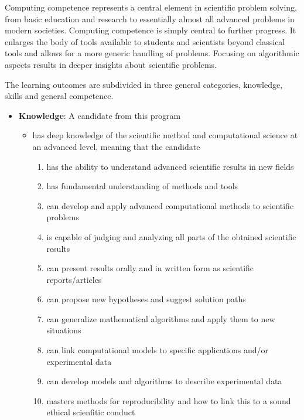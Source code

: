 \documentclass[%
oneside,                 %
final,                   %
10pt]{article}
\begin{document}
Computing competence represents a central element
in scientific problem solving, from basic education and research to
essentially almost all advanced problems in modern
societies. Computing competence is simply central to further
progress. It enlarges the body of tools available to students and
scientists beyond classical tools and allows for a more generic
handling of problems. Focusing on algorithmic aspects results in
deeper insights about scientific problems.

The learning outcomes are subdivided in three general categories, knowledge, skills and general competence.

\begin{itemize}
\item \textbf{Knowledge}: A candidate from this program
\begin{itemize}

 \item has deep knowledge of the scientific method and computational science at an advanced level, meaning that the candidate
\begin{enumerate}

 \item has the ability to understand advanced scientific results in new fields

 \item has fundamental understanding of methods and tools

 \item can develop and apply advanced computational methods to scientific problems

 \item is capable of judging and analyzing all parts of the obtained scientific results

 \item can present results orally and in written form as scientific reports/articles

 \item can propose new hypotheses and suggest solution paths

 \item can generalize mathematical algorithms and apply them to new situations

 \item can link computational models to specific applications and/or experimental data

 \item can develop models and algorithms to describe experimental data

\item masters methods for reproducibility and how to link this to a sound ethical scienfitic conduct


\end{enumerate}
\end{itemize}
\end{itemize}
\end{document}
